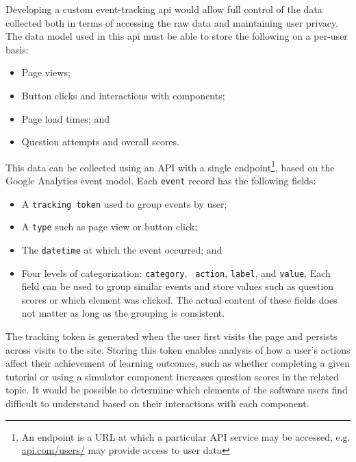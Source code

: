 \documentclass[bsc,twoside,singlespacing,parskip,logo,notimes,normalheadings]{infthesis}
\begin{document}
        Developing a custom event-tracking \gls{api} would allow full
        control of the data collected both in terms of accessing the
        raw data and maintaining user privacy. The data model used in
        this \gls{api} must be able to store the following on a
        per-user basis:

        \begin{itemize}
        \item Page views;
        \item Button clicks and interactions with components;
        \item Page load times; and
        \item Question attempts and overall scores.
        \end{itemize}

        This data can be collected using an API with a single
        endpoint\footnote{An endpoint is a URL at which a particular
          API service may be accessed, e.g. \url{api.com/users/} may
          provide access to user data}, based on the Google Analytics
        event model. Each {\tt event} record has the following fields:

        \begin{itemize}
        \item A {\tt tracking token} used to group events by user;
        \item A {\tt type} such as page view or button click;
        \item The {\tt datetime} at which the event occurred; and
        \item Four levels of categorization: {\tt category}, {\tt
            action}, {\tt label}, and {\tt value}. Each field can be
          used to group similar events and store values such as
          question scores or which element was clicked. The actual
          content of these fields does not matter as long as the
          grouping is consistent.
        \end{itemize}

        The tracking token is generated when the user first visits the
        page and persists across visits to the site. Storing this
        token enables analysis of how a user's actions affect their
        achievement of learning outcomes, such as whether completing a
        given tutorial or using a simulator component increases
        question scores in the related topic. It would be possible to
        determine which elements of the software users find difficult
        to understand based on their interactions with each component.
\end{document}
